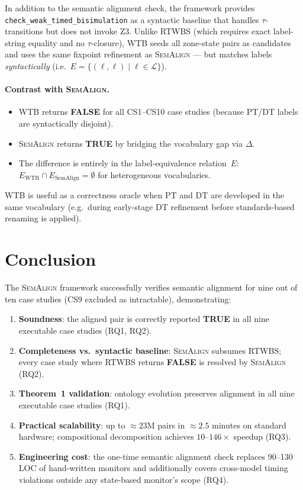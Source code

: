 \documentclass[10pt,a4paper]{article}
\newcommand{\OK}{\textcolor{okgreen}{\textbf{TRUE}}}
\newcommand{\FAIL}{\textcolor{warnred}{\textbf{FALSE}}}
\newcommand{\tool}{\textsc{SemAlign}}
\begin{document}
In addition to the semantic alignment check, the framework provides
\texttt{check\_weak\_timed\_bisimulation} as a syntactic baseline that
handles $\tau$-transitions but does not invoke Z3.
Unlike RTWBS (which requires exact label-string equality and no $\tau$-closure),
\textsc{WTB} seeds all zone-state pairs as candidates and uses the same
fixpoint refinement as \tool{} — but matches labels \emph{syntactically}
(i.e.\ $E = \{(\ell,\ell) \mid \ell \in \mathcal{L}\}$).

\paragraph{Contrast with \tool{}.}
\begin{itemize}
  \item \textsc{WTB} returns \FAIL{} for all CS1--CS10 case studies
        (because PT/DT labels are syntactically disjoint).
  \item \tool{} returns \OK{} by bridging the vocabulary gap via $\Delta$.
  \item The difference is entirely in the label-equivalence relation~$E$:
        $E_\text{WTB} \cap E_\text{SemAlign} = \emptyset$ for heterogeneous
        vocabularies.
\end{itemize}
\textsc{WTB} is useful as a correctness oracle when PT and DT are developed
in the same vocabulary (e.g.\ during early-stage DT refinement before
standards-based renaming is applied).

\section{Conclusion}

The \tool{} framework successfully verifies semantic alignment for nine out
of ten case studies (CS9 excluded as intractable), demonstrating:

\begin{enumerate}
  \item \textbf{Soundness}: the aligned pair is correctly reported \OK{} in
        all nine executable case studies (RQ1, RQ2).
  \item \textbf{Completeness vs.\ syntactic baseline}: \tool{} subsumes RTWBS;
        every case study where RTWBS returns \FAIL{} is resolved by \tool{}
        (RQ2).
  \item \textbf{Theorem~1 validation}: ontology evolution preserves alignment
        in all nine executable case studies (RQ1).
  \item \textbf{Practical scalability}: up to $\approx 23\text{M}$ pairs in
        $\approx 2.5$ minutes on standard hardware; compositional decomposition
        achieves $10$--$146\times$ speedup (RQ3).
  \item \textbf{Engineering cost}: the one-time semantic alignment check
        replaces 90--130\,LOC of hand-written monitors and additionally covers
        cross-model timing violations outside any state-based monitor's scope
        (RQ4).
\end{enumerate}
\end{document}
